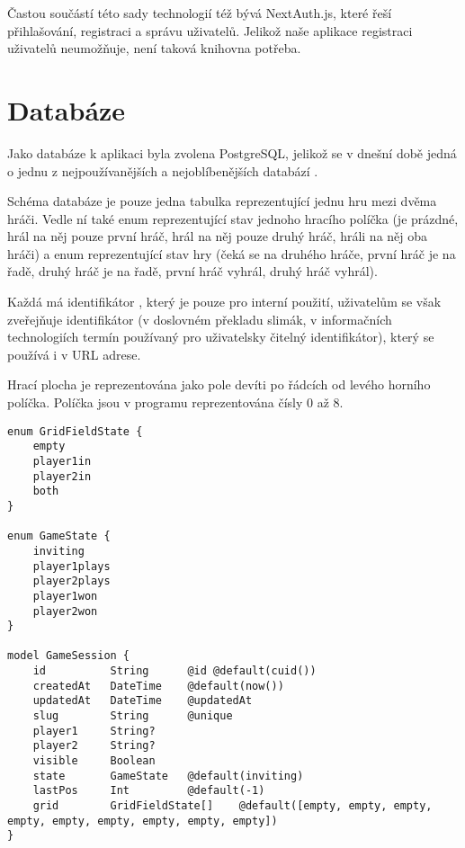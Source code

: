 Častou součástí této sady technologií též bývá NextAuth.js, které řeší přihlašování, registraci a správu uživatelů. Jelikož naše aplikace registraci uživatelů neumožňuje, není taková knihovna potřeba.

\section{Databáze}

Jako databáze k aplikaci byla zvolena PostgreSQL, jelikož se v dnešní době
jedná o jednu z nejpoužívanějších a nejoblíbenějších databází \cite{stackoverflow23}.

Schéma databáze je pouze jedna tabulka  reprezentující jednu hru
mezi dvěma hráči. Vedle ní také enum  reprezentující stav
jednoho hracího políčka (je prázdné, hrál na něj pouze první hráč, hrál na něj
pouze druhý hráč, hráli na něj oba hráči) a enum  reprezentující
stav hry (čeká se na druhého hráče, první hráč je na řadě, druhý hráč je na
řadě, první hráč vyhrál, druhý hráč vyhrál).

Každá  má identifikátor , který je pouze pro interní
použití, uživatelům se však zveřejňuje identifikátor  (v doslovném
překladu slimák, v informačních technologiích termín používaný pro uživatelsky
čitelný identifikátor), který se používá i v URL adrese.\label{par:game-id}

\label{par:game-grid}
Hrací plocha je reprezentována jako pole devíti  po řádcích
od levého horního políčka. Políčka jsou v programu reprezentována čísly 0 až 8.

\begin{lstlisting}[language=Prisma,caption={Schéma databáze},label={fig:db-schema}]
enum GridFieldState {
    empty
    player1in
    player2in
    both
}

enum GameState {
    inviting
    player1plays
    player2plays
    player1won
    player2won
}

model GameSession {
    id          String      @id @default(cuid())
    createdAt   DateTime    @default(now())
    updatedAt   DateTime    @updatedAt
    slug        String      @unique
    player1     String?
    player2     String?
    visible     Boolean
    state       GameState   @default(inviting)
    lastPos     Int         @default(-1)
    grid        GridFieldState[]    @default([empty, empty, empty, empty, empty, empty, empty, empty, empty])
}
\end{lstlisting}

